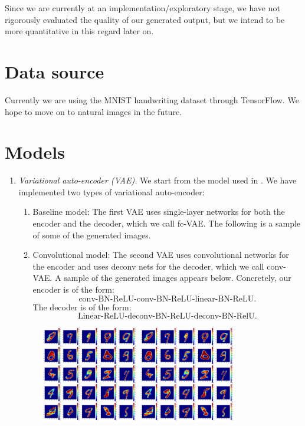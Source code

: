 \documentclass[11pt]{article}
\begin{document}
Since we are currently at an implementation/exploratory stage, we have not rigorously evaluated the quality of our generated output, but we intend to be more quantitative in this regard later on.

\section*{Data source}

Currently we are using the MNIST handwriting dataset through TensorFlow. We hope to move on to natural images in the future.

\section*{Models}

\begin{enumerate}
    \item \emph{Variational auto-encoder (VAE).} We start from the model used in \cite{kingma2013auto}. We have implemented two types of variational auto-encoder:
    \begin{enumerate}
        \item Baseline model: The first VAE uses single-layer networks for both the encoder and the decoder, which we call fc-VAE. The following is a sample of some of the generated images.
        \item Convolutional model: The second VAE uses convolutional networks for the encoder and  uses deconv nets for the decoder, which we call conv-VAE. A sample of the generated images appears below. Concretely, our encoder is of the form:
        \[\text{conv-BN-ReLU-conv-BN-ReLU-linear-BN-ReLU}.\]
        The decoder is of the form:
        \[\text{Linear-ReLU-deconv-BN-ReLU-deconv-BN-RelU}.\]
    \end{enumerate}
    \begin{figure}[!ht]
        \centering
        \includegraphics[width=0.4\textwidth]{img/fcvae.png}\quad
        \includegraphics[width=0.4\textwidth]{img/fcvae.png}

\end{figure}
\end{enumerate}
\end{document}
